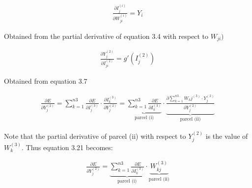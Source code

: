 \documentclass[
  12pt,
]{report}
\begin{document}
\vspace{-1em}

\begin{equation}
\begin{aligned}
\frac{\partial I_j^{(i)}}{\partial W_{ji}^{(i)}} = Y_i 
\label{eq:equation 3.20}
\end{aligned}
\end{equation} \vspace{-1em}

Obtained from the partial derivative of equation 3.4 with respect to
\(W_{ji})\)

\vspace{-1em}

\begin{equation}
\begin{aligned}
\frac{\partial Y_j^{(2)}}{\partial I_{ji}^{(2)}} = g'(I_j^{(2)}) 
\label{eq:equation 3.21}
\end{aligned}
\end{equation} \vspace{-1em}

Obtained from equation 3.7

\vspace{-1em}

\begin{equation}
\begin{aligned}
\frac{\partial E}{\partial Y_j^{(2)}} = \sum_{k=1}^{n3} \frac{\partial E}{\partial I_j^{(3)}} \cdot \frac{\partial I_k^{(3)}}{\partial Y_j^{(2)}} = 
\underbrace{\sum_{k=1}^{n3} \frac{\partial E}{\partial I_k^{(3)}}}_{\text{parcel (i)}} 
\cdot 
\underbrace{\frac{\partial \sum_{k=1}^{n3} W_kj^{(3)} \cdot Y_j^{(2)}}{\partial Y_j^{(2)}}}_{\text{parcel (ii)}}
\label{eq:equation 3.22}
\end{aligned}
\end{equation} \vspace{-1em}

Note that the partial derivative of parcel (ii) with respect to
\(Y_j^{(2)}\) is the value of \(W_k^{(3)}\). Thus equation 3.21 becomes:

\vspace{-1em}

\begin{equation}
\begin{aligned}
\frac{\partial E}{\partial Y_j^{(2)}} = \underbrace{\sum_{k=1}^{n3} \frac{\partial E}{\partial I_k^{(3)}}}_{\text{parcel (i)}} \cdot \underbrace{W_{kj}^{(3)}}_{\text{parcel (ii)}}
\label{eq:equation 3.23}
\end{aligned}
\end{equation} \vspace{-1em}
\end{document}
